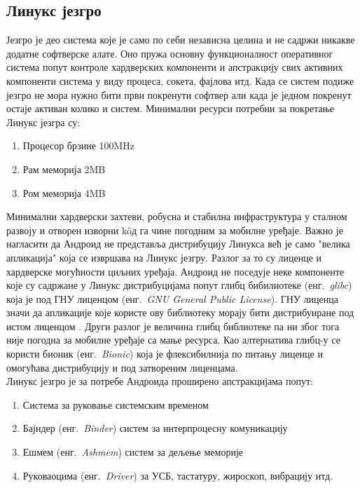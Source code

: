 \documentclass[12pt,oneside]{memoir}
\theoremstyle{remark}
\begin{document}
\subsection{Линукс језгро}
Језгро је део система које је само по себи независна целина и не садржи никакве додатне софтверске алате.  Оно пружа основну функционалност оперативног система попут контроле хардверских компоненти и апстракцију свих активних компоненти система у виду процеса, сокета, фајлова итд. Када се систем подиже језгро не мора нужно бити први покренути софтвер али када је једном покренут остаје активан колико и систем. Минимални ресурси потребни за покретање Линукс језгра су:
\begin{enumerate}
\item Процесор брзине 100MHz
\item Рам меморија 2MB
\item Ром меморија 4MB
\end{enumerate}
Минимални хардверски захтеви, робусна и стабилна инфраструктура у сталном развоју и отворен изворни k\^{o}д га чине погодним за мобилне уређаје. Важно је нагласити да Андроид не представља дистрибуцију Линукса већ је само "велика апликација" која се извршава на Линукс језгру. Разлог за то су лиценце и хардверске могућности циљних уређаја. Андроид не поседује неке компоненте које су садржане у Линукс дистрибуцијама попут глибц бибилиотеке (енг.~{\em glibc}) која је под ГНУ лиценцом  (енг.~{\em GNU General Public License}). ГНУ лиценца значи да апликације које користе ову библиотеку морају бити дистрибуиране под истом лиценцом \cite{gnulicence}. Други разлог је величина глибц библиотеке па ни због тога није погодна за мобилне уређаје са мање ресурса. Као алтернатива глибц-у се користи бионик (енг.~{\em Bionic}) која је флексибилнија по питању лиценце и омогућава дистрибуцију и под затвореним лиценцама.\\
Линукс језгро је за потребе Андроида проширено апстракцијама попут:

\begin{enumerate}
\item Система за руковање системским временом
\item Бајндер (енг.~{\em Binder}) систем за интерпроцесну комуникацију
\item Ешмем (енг.~{\em Ashmem}) систем за дељење меморије
\item Руковаоцима (енг.~{\em Driver}) за УСБ, тастатуру, жироскоп, вибрацију итд.
\end{enumerate}
\end{document}
